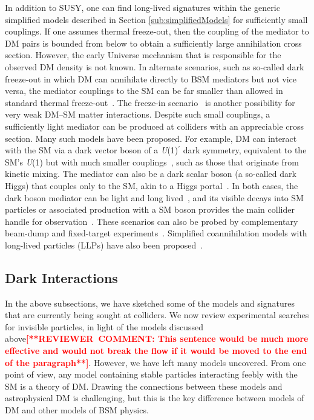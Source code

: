 \documentclass{ar-1col}
\newcommand{\IP}{invisible particle}
\begin{document}
In addition to SUSY, one can find long-lived signatures within the
generic simplified models described in Section \ref{sub:simplifiedModels}
for sufficiently small couplings. If one assumes thermal freeze-out, then the
coupling of the mediator to DM pairs is bounded from below to
obtain a sufficiently large annihilation cross section. However,
the early Universe mechanism that is
responsible for the observed DM density is not known. In alternate scenarios,
such as so-called dark freeze-out in which DM can annihilate directly to
BSM mediators but not vice versa, the mediator couplings to the SM
can be far smaller than allowed in standard thermal freeze-out~\cite{Pospelov:2007mp,Das:2010ts}. The freeze-in
scenario~\cite{Co:2015pka,Bernal:2017kxu} is another possibility
for very weak DM--SM matter interactions. Despite such small couplings, a
sufficiently light mediator can be produced at colliders with
an appreciable cross section. Many such models have been proposed. For example, DM can interact with the SM via a dark
vector boson of a \textit{U}(1)$^{\prime}$ dark symmetry, equivalent to the SM's \textit{U}(1)
but with much smaller couplings~\cite{Holdom:1985ag}, such as
those that originate from kinetic mixing. The mediator can also be a
dark scalar boson (a so-called dark Higgs) that couples only to the SM,
akin to a Higgs portal~\cite{Curtin:2014cca}. In both cases, the
dark boson mediator can be light and
long lived~\cite{Pospelov:2007mp}, and its visible decays into SM
particles or associated production with a SM boson provides the
main collider handle for observation~\cite{Curtin:2014cca}. These
scenarios can also be probed by complementary beam-dump and fixed-target experiments~\cite{Battaglieri:2017aum}. Simplified
coannihilation models with long-lived particles (LLPs) have also been
proposed~\cite{ElHedri:2017nny}.

\subsection{Dark Interactions}\label{sec:darkint}

In the above subsections, we have sketched some of the models and signatures
that are currently being sought at colliders. We now review
experimental searches for {\IP}s, in light of the models discussed
above\textbf{\textcolor{red}{[**REVIEWER\ COMMENT: This sentence would be much more effective and would not break the flow if it would be moved to the end of the paragraph**]}}. However, we have left many models uncovered. From one
point of view, any model containing stable particles interacting
feebly with the SM is a theory of DM. Drawing the connections
between these models and astrophysical DM is challenging, but this
is the key difference between models of DM and other models of BSM
physics.
\end{document}
